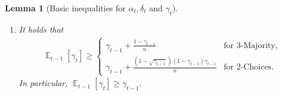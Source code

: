 \documentclass[letterpaper,11pt]{article}
\newtheorem{lemma}[theorem]{Lemma}
\DeclareMathOperator*{\E}{\mathbb{E}}
\newcommand{\alphanorm}{\gamma}
\begin{document}
\begin{lemma}[Basic inequalities for $\alpha_t, \delta_t$ and $\alphanorm_t$]
\begin{enumerate}
\begin{align*}
\begin{cases}
      \frac{1}{n}(\alpha_{t-1}(i)+\alpha_{t-1}(j))(\alpha_{t-1}(i)+\alpha_{t-1}(j)+\alphanorm_{t-1})	& \text{for 2-Choices}.
    \end{cases} %
  \end{align*}
\item \label{item:expectation of alphanorm} 
It holds that
\begin{align*} 
\E_{t-1}[\alphanorm_{t}] \ge \begin{cases}
   \alphanorm_{t-1}+\frac{1-\alphanorm_{t-1}}{n}	& \text{for 3-Majority},\\[10pt]
   \alphanorm_{t-1}+\frac{(1-\sqrt{\alphanorm_{t-1}})(1-\alphanorm_{t-1})\alphanorm_{t-1}}{n}	& \text{for 2-Choices}.
 \end{cases} 
\end{align*}
In particular, $\E_{t-1}[\alphanorm_{t}] \geq \alphanorm_{t-1}$.
\end{enumerate}
\end{lemma}
\end{document}
